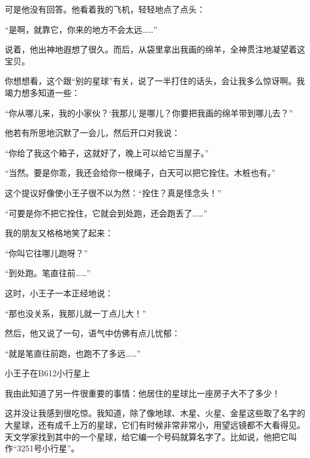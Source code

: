 可是他没有回答。他看着我的飞机，轻轻地点了点头：

“是啊，就靠它，你来的地方不会太远\ldots{}\ldots{}”

说着，他出神地遐想了很久。而后，从袋里拿出我画的绵羊，全神贯注地凝望着这宝贝。

你想想看，这个跟“别的星球”有关，说了一半打住的话头，会让我多么惊讶啊。我竭力想多知道一些：

{\startalignment[center]
 \stopalignment}

“你从哪儿来，我的小家伙？‘我那儿'是哪儿？你要把我画的绵羊带到哪儿去？”

他若有所思地沉默了一会儿，然后开口对我说：

“你给了我这个箱子，这就好了，晚上可以给它当屋子。”

“当然。要是你乖，我还会给你一根绳子，白天可以把它拴住。木桩也有。”

这个提议好像使小王子很不以为然：“拴住？真是怪念头！”

“可要是你不把它拴住，它就会到处跑，还会跑丢了\ldots{}\ldots{}”

我的朋友又格格地笑了起来：

“你叫它往哪儿跑呀？”

“到处跑。笔直往前\ldots{}\ldots{}”

这时，小王子一本正经地说：

“那也没关系，我那儿就一丁点儿大！”

然后，他又说了一句，语气中仿佛有点儿忧郁：

“就是笔直往前跑，也跑不了多远\ldots{}\ldots{}”

{\startalignment[center]
 \stopalignment}

小王子在B612小行星上


\stoptitle

\starttitle[title={4},reference={part0006.html_a007}]

我由此知道了另一件很重要的事情：他居住的星球比一座房子大不了多少！

这并没让我感到很吃惊。我知道，除了像地球、木星、火星、金星这些取了名字的大星球，还有成千上万的星球，它们有时候非常非常小，用望远镜都不大看得见。天文学家找到其中的一个星球，给它编一个号码就算名字了。比如说，他把它叫作“3251号小行星”。

